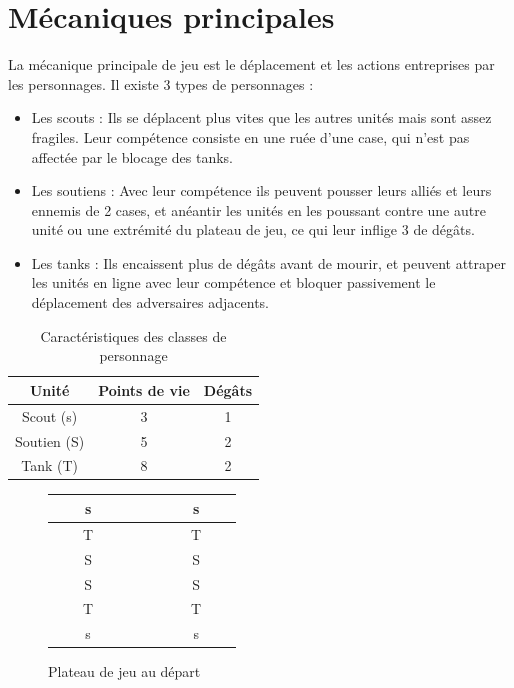 \documentclass[a4paper]{scrreprt}
\begin{document}
\section{Mécaniques principales}

La mécanique principale de jeu est le déplacement et les actions entreprises par les personnages. Il existe 3 types de personnages :
\begin{itemize}
    \item Les scouts : Ils se déplacent plus vites que les autres unités mais sont assez fragiles. Leur compétence consiste en une ruée d'une case, qui n'est pas affectée par le blocage des tanks.
    \item Les soutiens : Avec leur compétence ils peuvent pousser leurs alliés et leurs ennemis de 2 cases, et anéantir les unités en les poussant contre une autre unité ou une extrémité du plateau de jeu, ce qui leur inflige 3 de dégâts.
    \item Les tanks : Ils encaissent plus de dégâts avant de mourir, et peuvent attraper les unités en ligne avec leur compétence et bloquer passivement le déplacement des adversaires adjacents.
\end{itemize}

\begin{table}
    \centering
    \begin{tabular}{|c|c|c|}
        \hline
        Unité & Points de vie & Dégâts \\
        \hline
        \hline
        Scout (s) & 3 & 1\\ \hline
        Soutien (S) & 5 & 2\\ \hline
        Tank (T) & 8 & 2\\ \hline
    \end{tabular}
    \caption{Caractéristiques des classes de personnage}
    \label{tab:tabstats}
\end{table}


\begin{figure}
    \centering
    \begin{tabular}{|c|c|c|c|c|c|c|c|c|c|c|c|}
    \hline
         &&\cellcolor{cgreen}s&&&&&&&\cellcolor{cred}s&&  \\ \hline
         &\cellcolor{yellow}&\cellcolor{cgreen}T&&&&&&&\cellcolor{cred}T&\cellcolor{yellow}&  \\ \hline
         &&\cellcolor{cgreen}S&&&&&&&\cellcolor{cred}S&&  \\ \hline
         &&\cellcolor{cgreen}S&&&&&&&\cellcolor{cred}S&&  \\ \hline
         &\cellcolor{yellow}&\cellcolor{cgreen}T&&&&&&&\cellcolor{cred}T&\cellcolor{yellow}&  \\ \hline
         &&\cellcolor{cgreen}s&&&&&&&\cellcolor{cred}s&&  \\ \hline
    \end{tabular}
    \caption{Plateau de jeu au départ}
    \label{fig:plateau}
\end{figure}
\end{document}
